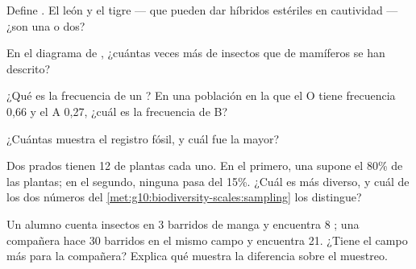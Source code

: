 \begin{exercise}[$\star$]\label{exo:g10:biodiversity-scales:2}
Define . El león y el tigre --- que pueden dar híbridos
estériles en cautividad --- ¿son una  o dos?
\end{exercise}

\begin{exercise}[$\star$]\label{exo:g10:biodiversity-scales:3}
En el diagrama de , ¿cuántas veces más  de insectos que
de mamíferos se han descrito?
\end{exercise}

\begin{exercise}[$\star$]\label{exo:g10:biodiversity-scales:4}
¿Qué es la frecuencia de un ? En una población en la que el 
O tiene frecuencia 0,66 y el  A 0,27, ¿cuál es la frecuencia de B?
\end{exercise}

\begin{exercise}[$\star$]\label{exo:g10:biodiversity-scales:5}
¿Cuántas  muestra el registro fósil, y cuál fue la
mayor?
\end{exercise}

\begin{exercise}[$\star\star$]\label{exo:g10:biodiversity-scales:6}
Dos prados tienen 12  de plantas cada uno. En el primero, una
 supone el 80\% de las plantas; en el segundo, ninguna pasa del
15\%. ¿Cuál es más diverso, y cuál de los dos números del
\cref{met:g10:biodiversity-scales:sampling} los distingue?
\end{exercise}

\begin{exercise}[$\star\star$]\label{exo:g10:biodiversity-scales:7}
Un alumno cuenta insectos en 3 barridos de manga y encuentra 8
; una compañera hace 30 barridos en el mismo campo y encuentra
21. ¿Tiene el campo más  para la compañera? Explica qué
muestra la diferencia sobre el muestreo.
\end{exercise}

